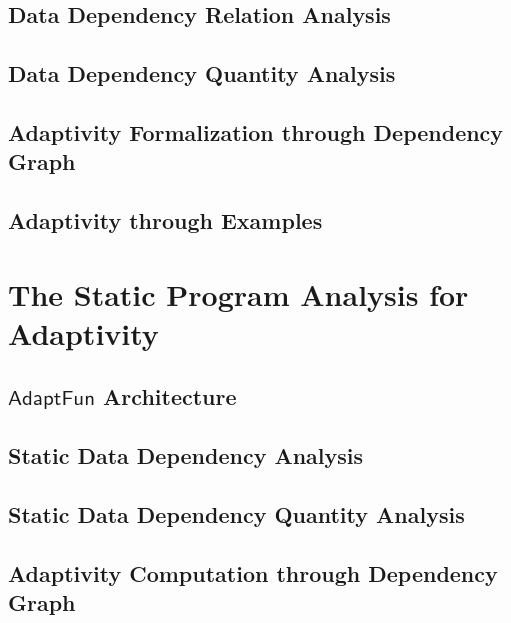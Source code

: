 \documentclass[12pt, letterpaper]{report}   %
\newcommand{\THESYSTEM}{\textsf{AdaptFun}}
\begin{document}
\subsection{Data Dependency Relation Analysis}
\label{sec:dynamic-datadep}


\subsection{Data Dependency Quantity Analysis}
\label{sec:dynamic-reachability}
%

\subsection{Adaptivity Formalization through Dependency Graph}
\label{sec:dynamic-adapt}
%
%
\subsection{Adaptivity through Examples}
\label{sec:dynamic-examples}
%


\clearpage
\section{The Static Program Analysis for Adaptivity}
\label{ch:static}


\subsection{$\THESYSTEM$ Architecture}
\label{sec:static-overview}


\subsection{Static Data Dependency Analysis}
\label{sec:static-dep}
% 


\subsection{Static Data Dependency Quantity Analysis}
\label{sec:static-quantity}


\subsection{Adaptivity Computation through Dependency Graph}
\label{sec:static-adapt}

\end{document}

